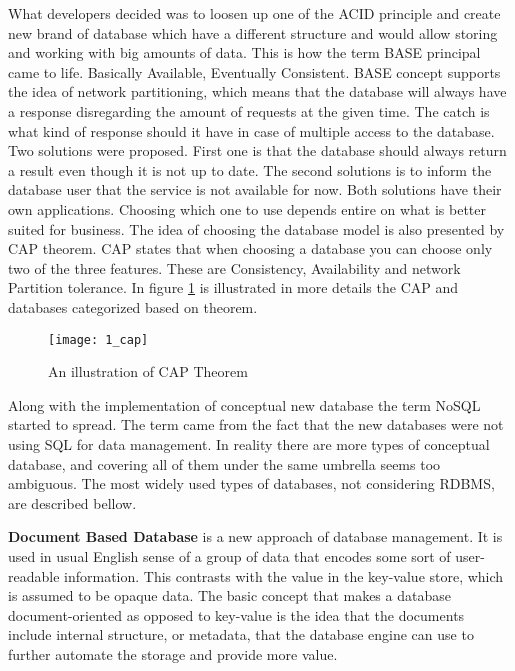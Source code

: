 What developers decided was to loosen up one of the ACID principle and create new brand of database which have a different structure and would allow storing and working with big amounts of data. This is how the term BASE principal came to life. Basically Available, Eventually Consistent. BASE concept supports the idea of network partitioning, which means that the database will always have a response disregarding the amount of requests at the given time. The catch is what kind of response should it have in case of multiple access to the database. Two solutions were proposed. First one is that the database should always return a result even though it is not up to date. The second solutions is to inform the database user that the service is not available for now. Both solutions have their own applications. Choosing which one to use depends entire on what is better suited for business. The idea of choosing the database model is also presented by CAP theorem. CAP states that when choosing a database you can choose only two of the three features. These are Consistency, Availability and network Partition tolerance. In figure \mbox{\ref{cap}} is illustrated in more details the CAP and databases categorized based on theorem.

\begin{figure}[!ht]
\centering
\texttt{[image: 1\_cap]}
\caption{An illustration of CAP Theorem}\label{cap}
\end{figure}

Along with the implementation of conceptual new database the term NoSQL started to spread. The term came from the fact that the new databases were not using SQL for data management. In reality there are more types of conceptual database, and covering all of them under the same umbrella seems too ambiguous.
The most widely used types of databases, not considering RDBMS, are described bellow.

\textbf{Document Based Database} is a new approach of database management. It is used in usual English sense of a group of data that encodes some sort of user-readable information. This contrasts with the value in the key-value store, which is assumed to be opaque data. The basic concept that makes a database document-oriented as opposed to key-value is the idea that the documents include internal structure, or metadata, that the database engine can use to further automate the storage and provide more value.

